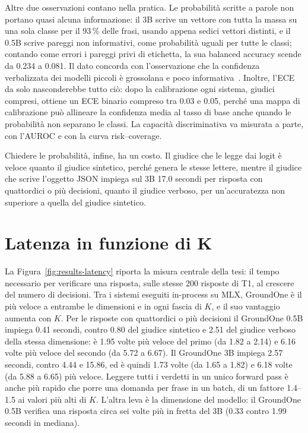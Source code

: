 Altre due osservazioni contano nella pratica. Le probabilità scritte a parole non portano quasi alcuna informazione: il
3B scrive un vettore con tutta la massa su una sola classe per il 93\,\% delle frasi, usando appena sedici vettori
distinti, e il 0.5B scrive pareggi non informativi, come probabilità uguali per tutte le classi; contando come errori i
pareggi privi di etichetta, la sua balanced accuracy scende da 0.234 a 0.081. Il dato concorda con l'osservazione che la
confidenza verbalizzata dei modelli piccoli è grossolana e poco informativa~\cite{xiong2024uncertainty,tian2023justask}.
Inoltre, l'ECE da solo nasconderebbe tutto ciò: dopo la calibrazione ogni sistema, giudici compresi, ottiene un ECE
binario compreso tra 0.03 e 0.05, perché una mappa di calibrazione può allineare la confidenza media al tasso di base
anche quando le probabilità non separano le classi. La capacità discriminativa va misurata a parte, con l'AUROC e con la
curva risk--coverage.

Chiedere le probabilità, infine, ha un costo. Il giudice che le legge dai logit è veloce quanto il giudice sintetico,
perché genera le stesse lettere, mentre il giudice che scrive l'oggetto JSON impiega sul 3B 17.0 secondi per risposta
con quattordici o più decisioni, quanto il giudice verboso, per un'accuratezza non superiore a quella del giudice
sintetico.

\section{Latenza in funzione di K}
\label{sec:results-latency}

La Figura~\ref{fig:results-latency} riporta la misura centrale della tesi: il tempo necessario per verificare una
risposta, sulle stesse 200 risposte di T1, al crescere del numero di decisioni. Tra i sistemi eseguiti in-process su MLX,
GroundOne è il più veloce a entrambe le dimensioni e in ogni fascia di $K$, e il suo vantaggio aumenta con $K$. Per le
risposte con quattordici o più decisioni il GroundOne 0.5B impiega 0.41 secondi, contro 0.80 del giudice sintetico e
2.51 del giudice verboso della stessa dimensione: è 1.95 volte più veloce del primo (da 1.82 a 2.14) e 6.16 volte più
veloce del secondo (da 5.72 a 6.67). Il GroundOne 3B impiega 2.57 secondi, contro 4.44 e 15.86, ed è quindi 1.73 volte
(da 1.65 a 1.82) e 6.18 volte (da 5.88 a 6.65) più veloce. Leggere tutti i verdetti in un unico forward pass è anche più
rapido che porre una domanda per frase in un batch, di un fattore 1.4--1.5 ai valori più alti di $K$. L'altra leva è la
dimensione del modello: il GroundOne 0.5B verifica una risposta circa sei volte più in fretta del 3B (0.33 contro 1.99
secondi in mediana).


